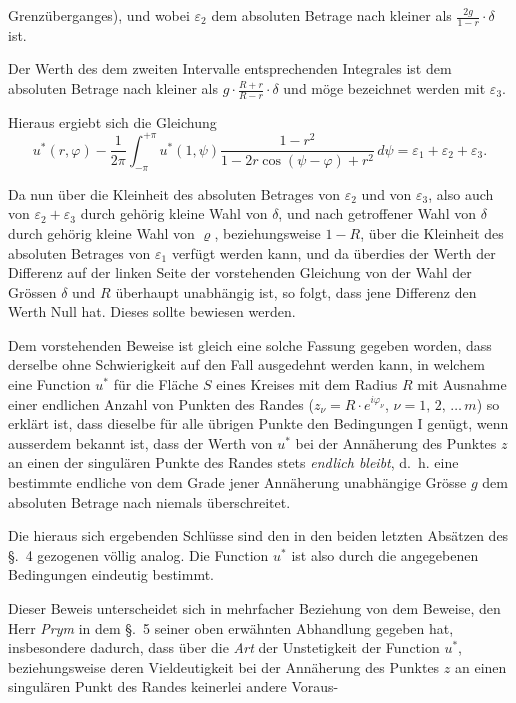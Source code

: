 \documentclass{article}
\begin{document}
Grenzüberganges), und wobei $\varepsilon_2$ dem absoluten Betrage nach kleiner als $\frac{2g}{1 - r} \cdot \delta$ ist.

Der Werth des dem zweiten Intervalle entsprechenden Integrales ist dem absoluten Betrage nach kleiner als $g \cdot \frac{R + r}{R - r} \cdot \delta$ und möge bezeichnet werden mit $\varepsilon_3$.

Hieraus ergiebt sich die Gleichung
\[
u^*(r, \varphi) - \frac{1}{2\pi} \int_{-\pi}^{+\pi} u^*(1, \psi) \frac{1 - r^2}{1 - 2r \cos(\psi - \varphi) + r^2}\,d\psi = \varepsilon_1 + \varepsilon_2 + \varepsilon_3.
\]

Da nun über die Kleinheit des absoluten Betrages von $\varepsilon_2$ und von $\varepsilon_3$, also auch von $\varepsilon_2 + \varepsilon_3$ durch gehörig kleine Wahl von $\delta$, und nach getroffener Wahl von $\delta$ durch gehörig kleine Wahl von $\varrho$, beziehungsweise $1 - R$, über die Kleinheit des absoluten Betrages von $\varepsilon_1$ verfügt werden kann, und da überdies der Werth der Differenz auf der linken Seite der vorstehenden Gleichung von der Wahl der Grössen $\delta$ und $R$ überhaupt unabhängig ist, so folgt, dass jene Differenz den Werth Null hat. Dieses sollte bewiesen werden.

Dem vorstehenden Beweise ist gleich eine solche Fassung gegeben worden, dass derselbe ohne Schwierigkeit auf den Fall ausgedehnt werden kann, in welchem eine Function $u^*$ für die Fläche $S$ eines Kreises mit dem Radius $R$ mit Ausnahme einer endlichen Anzahl von Punkten des Randes ($z_\nu = R \cdot e^{i\varphi_\nu}$, $\nu = 1, \, 2, \, \dots \, m$) so erklärt ist, dass dieselbe für alle übrigen Punkte den Bedingungen I genügt, wenn ausserdem bekannt ist, dass der Werth von $u^*$ bei der Annäherung des Punktes $z$ an einen der singulären Punkte des Randes stets \emph{endlich bleibt}, d.~h. eine bestimmte endliche von dem Grade jener Annäherung unabhängige Grösse $g$ dem absoluten Betrage nach niemals überschreitet.

Die hieraus sich ergebenden Schlüsse sind den in den beiden letzten Absätzen des §.~4 gezogenen völlig analog. Die Function $u^*$ ist also durch die angegebenen Bedingungen eindeutig bestimmt.

Dieser Beweis unterscheidet sich in mehrfacher Beziehung von dem Beweise, den Herr \emph{Prym} in dem §.~5 seiner oben erwähnten Abhandlung gegeben hat, insbesondere dadurch, dass über die \emph{Art} der Unstetigkeit der Function $u^*$, beziehungsweise deren Vieldeutigkeit bei der Annäherung des Punktes $z$ an einen singulären Punkt des Randes keinerlei andere Voraus-
\end{document}
